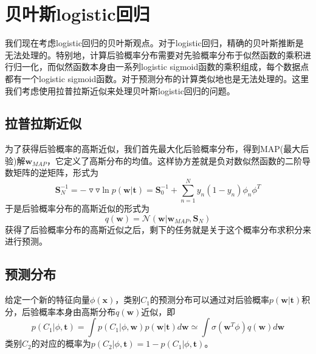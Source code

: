 \section{贝叶斯logistic回归}
我们现在考虑logistic回归的贝叶斯观点。对于logistic回归，精确的贝叶斯推断是无法处理的。特别地，计算后验概率分布需要对先验概率分布于似然函数的乘积进行归一化，而似然函数本身由一系列logistic sigmoid函数的乘积组成，每个数据点都有一个logistic sigmoid函数。对于预测分布的计算类似地也是无法处理的。这里我们考虑使用拉普拉斯近似来处理贝叶斯logistic回归的问题。
\subsection*{拉普拉斯近似}
为了获得后验概率的高斯近似，我们首先最大化后验概率分布，得到MAP(最大后验)解$\boldsymbol{w}_{MAP}$，它定义了高斯分布的均值。这样协方差就是负对数似然函数的二阶导数矩阵的逆矩阵，形式为
\begin{equation}
	\boldsymbol{S}_N^{-1}=-\triangledown\triangledown \ln p(\boldsymbol{w}|\boldsymbol{t})=\boldsymbol{S}_0^{-1}+\sum_{n=1}^{N}y_n(1-y_n)\phi_n\phi^T
\end{equation}
于是后验概率分布的高斯近似的形式为
\begin{equation}
\label{lala}
	q(\boldsymbol{w})=\mathcal{N}(\boldsymbol{w}|\boldsymbol{w}_{MAP},\boldsymbol{S}_N)
\end{equation}
获得了后验概率分布的高斯近似之后，剩下的任务就是关于这个概率分布求积分来进行预测。
\subsection*{预测分布}
给定一个新的特征向量$\phi(\boldsymbol{x})$，类别$C_1$的预测分布可以通过对后验概率$p(\boldsymbol{w}|\boldsymbol{t})$积分，后验概率本身由高斯分布$q(\boldsymbol{w})$近似，即
\begin{equation}
	p(C_1|\phi,\boldsymbol{t})=\int p(C_1|\phi,\boldsymbol{w})p(\boldsymbol{w}|\boldsymbol{t})d\boldsymbol{w}\simeq \int \sigma(\boldsymbol{w}^T\phi)q(\boldsymbol{w})d\boldsymbol{w}
\end{equation}
类别$C_2$的对应的概率为$p(C_2|\phi,\boldsymbol{t})=1-p(C_1|\phi,\boldsymbol{t})$。

